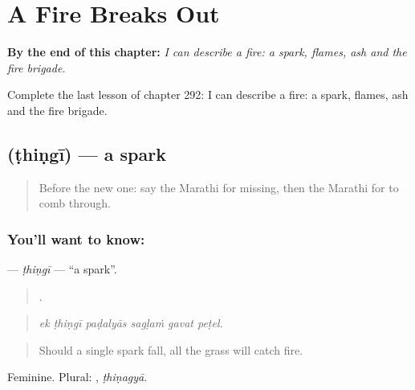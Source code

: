 
\chapter{A Fire Breaks Out}
\label{ch:mr-a-fire-breaks-out}

\begin{chapteropening}
\textbf{By the end of this chapter:} \emph{I can describe a fire: a spark, flames, ash and the fire brigade.}

Complete the last lesson of chapter 292: I can describe a fire: a spark, flames, ash and the fire brigade.
\end{chapteropening}

\section[\texorpdfstring{\mr{ठिणगी} (ṭhiṇgī)}{ठिणगी (ṭhiṇgī)}]{ (ṭhiṇgī) — a spark}

\label{lesson:MR-C292-thingi}



\begin{quote}
Before the new one: say the Marathi for missing, then the Marathi for to comb through.
\end{quote}

\subsection*{You'll want to know: }
\textbf{} — \emph{ṭhiṇgī} — \textquotedblleft{}a spark\textquotedblright{}.

\begin{quote}
     .
\end{quote}

\begin{quote}
\emph{ek ṭhiṇgī paḍalyās sagḷaṁ gavat peṭel.}
\end{quote}

\begin{quote}
Should a single spark fall, all the grass will catch fire.
\end{quote}

Feminine. Plural: , \emph{ṭhiṇagyā}.

